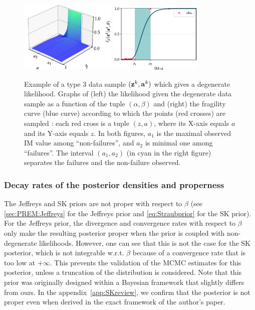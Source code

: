 \begin{figure}[h]
    \centering
    \includegraphics[width=4.6cm]{figures/PREM/likelihood_degen.pdf}\qquad
    \includegraphics[width=4.44cm]{figures/PREM/degeneracy.pdf}
    \caption{{Example of a type 3 data sample $(\mathbf{z}^k,\mathbf{a}^k)$ which gives a degenerate likelihood. Graphs of (left) the likelihood given the degenerate data sample as a function of the tuple $(\alpha,\beta)$ and (right) the fragility curve (blue curve) according to which the points (red crosses) are sampled : each red cross is a tuple $(z,a)$, where its X-axis equals $a$ and its Y-axis equals $z$.}
    In both figures, $a_1$ is the maximal observed IM value among ``non-failures'', and $a_2$ is minimal one among ``failures''.
    The interval $(a_1,a_2)$ (in cyan in the right figure) separates the failures and the non-failure observed.
    }
    \label{fig:degenerate-frag}
\end{figure}




\subsubsection{Decay rates of the posterior densities and properness}


The Jeffreys and SK priors are not proper with respect to $\beta$ (see \cref{sec:PREM:Jeffreys} for the Jeffreys prior and \cref{eq:Straubprior} for the SK prior). For the Jeffreys prior, the divergence and convergence rates with respect to $\beta$ only make the resulting posterior proper when the prior is coupled with non-degenerate likelihoods. 
 However, one can see that this is not the case for the SK posterior, which is not integrable w.r.t. $\beta$ because of a convergence rate that is too low at $+\infty$. This prevents the validation of the MCMC estimates for this posterior, unless a truncation of the distribution is considered. %
 Note that this prior was originally designed within
a Bayesian framework that slightly differs from ours. In the appendix~\ref{app:SKreview}, we confirm that the posterior is not proper even when derived in the exact framework of the author's paper. %




